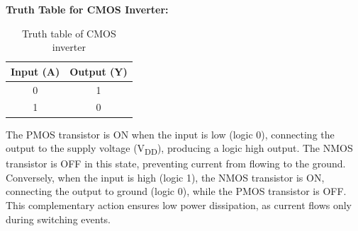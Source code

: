 \documentclass[a4paper,12pt]{article}
\begin{document}
\textbf{Truth Table for CMOS Inverter:}

\begin{table}[H]
	\centering
	\begin{tabular}{|c|c|}
		\hline
		\textbf{Input (A)} & \textbf{Output (Y)} \\
		\hline
		0 & 1 \\
		1 & 0 \\
		\hline
	\end{tabular}
	\caption{Truth table of CMOS inverter}
\end{table}

The PMOS transistor is ON when the input is low (logic 0), connecting the output to the supply voltage (V\textsubscript{DD}), producing a logic high output. The NMOS transistor is OFF in this state, preventing current from flowing to the ground. Conversely, when the input is high (logic 1), the NMOS transistor is ON, connecting the output to ground (logic 0), while the PMOS transistor is OFF. This complementary action ensures low power dissipation, as current flows only during switching events.
\end{document}
